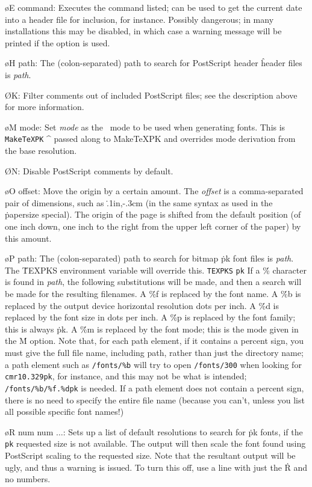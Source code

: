 {\o E command:
Executes the command listed; can be used to get the current date into a
header file for inclusion, for instance.  Possibly dangerous; in many
installations this may be disabled, in which case a warning message will
be printed if the option is used.

\o H path:
The (colon-separated) path to search for PostScript header 
\^{header}
files is {\it path}.

\O K:
Filter comments out of included PostScript files; see the description
above for more information.

\o M mode: Set {\it mode}
as the \MF\ mode to be used when generating fonts.  This is
\^{{\tt MakeTeXPK}}
\^{{\MF}}
passed along to \.{MakeTeXPK} and overrides mode derivation from the
base resolution.

\O N:  Disable PostScript comments by default.

\o O offset:
Move the origin by a certain amount.  The {\it offset} is a comma-separated
pair of dimensions, such as \.{.1in,-.3cm} (in the same syntax as used in
the \.{papersize} special).   The origin of the page is shifted from the
default position (of one inch down, one inch to the right from the upper
left corner of the paper) by this amount.

\o P path:  The (colon-separated) path to search for bitmap \.{pk}
font files is
{\it path}.  The \.{TEXPKS} environment variable will override this.
\^{{\tt TEXPKS}}
\^{{\tt pk}}
If a \.{\%} character is found in {\it path},
the following substitutions will be made, and then a search will
be made for the resulting filenames.
A \.{\%f} is replaced by the font name.
A \.{\%b} is replaced by the output device horizontal resolution dots per inch.
A \.{\%d} is replaced by the font size in dots per inch.
A \.{\%p} is replaced by the font family; this is always \.{pk}.
A \.{\%m} is replaced by the font mode; this is the mode given
in the \.{M} option.
Note that, for each path element, if it contains a percent sign, you
must give the full file name, including path, rather than just the
directory name; a path element such as {\tt /fonts/\%b} will try to
open {\tt /fonts/300} when looking for {\tt cmr10.329pk}, for
instance, and this may not be what is intended; {\tt /fonts/\%b/\%f.\%dpk}
is needed.  If a path element does not contain a percent sign, there
is no need to specify the entire file name (because you can't, unless
you list all possible specific font names!)

\o R num num $\ldots$:
Sets up a list of default resolutions to search for \.{pk} fonts, if the
\^{{\tt pk}}
requested size is not available.  The output will then scale the font
found using PostScript scaling to the requested size.  Note that the
resultant output will be ugly, and thus a warning is issued.  To turn
this off, use a line with just the \.{R} and no numbers.

}
